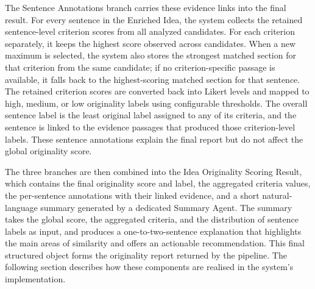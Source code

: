 The Sentence Annotations branch carries these evidence links into the final result. For every sentence in the Enriched Idea, the system collects the retained sentence-level criterion scores from all analyzed candidates. For each criterion separately, it keeps the highest score observed across candidates. When a new maximum is selected, the system also stores the strongest matched section for that criterion from the same candidate; if no criterion-specific passage is available, it falls back to the highest-scoring matched section for that sentence. The retained criterion scores are converted back into Likert levels and mapped to high, medium, or low originality labels using configurable thresholds. The overall sentence label is the least original label assigned to any of its criteria, and the sentence is linked to the evidence passages that produced those criterion-level labels. These sentence annotations explain the final report but do not affect the global originality score.

The three branches are then combined into the Idea Originality Scoring Result, which contains the final originality score and label, the aggregated criteria values, the per-sentence annotations with their linked evidence, and a short natural-language summary generated by a dedicated Summary Agent. The summary takes the global score, the aggregated criteria, and the distribution of sentence labels as input, and produces a one-to-two-sentence explanation that highlights the main areas of similarity and offers an actionable recommendation. This final structured object forms the originality report returned by the pipeline. The following section describes how these components are realised in the system's implementation.
